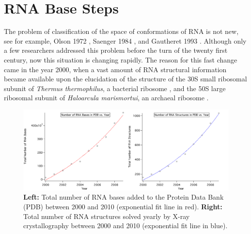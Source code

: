 \chapter{RNA Base Steps}
\label{basesteps} 

The problem of classification of the space of conformations
of RNA  is not  new, see for  example, Olson  1972 \cite{olson1_1972},
Saenger     1984     \cite{saenger1984},     and    Gautheret     1993
\cite{gautheret1993}.  Although only  a few researchers addressed this
problem  before  the  turn  of  the twenty  first  century,  now  this
situation is changing rapidly. The reason for this fast change came in
the year 2000, when a vast amount of RNA structural information became
available  upon the  elucidation of  the  structure of  the 30S  small
ribosomal  subunit  of   \textit{Thermus  thermophilus},  a  bacterial
ribosome  \cite{wimberly2000,  schluenzen2000},   and  the  50S  large
ribosomal subunit of \textit{Haloarcula marismortui}, an archaeal
ribosome \cite{ban2000}.
\begin{figure}[H]
\centering
\includegraphics[scale=0.38]{Chapter2/rna2000_2009copy.png}
\caption{\textbf{Left:} Total number of RNA bases added to the Protein
  Data  Bank (PDB)  between 2000  and  2010 (exponential  fit line  in
  red). \textbf{Right:}  Total number of RNA  structures solved yearly
  by X-ray crystallography between 2000 and 2010 (exponential fit line
  in blue).}
\label{fig:rnainpdb}
\end{figure}

